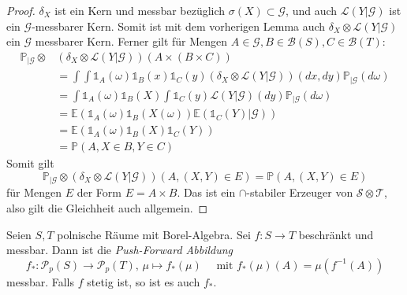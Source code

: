 \begin{proof}
    $\delta_X$ ist ein Kern und messbar bezüglich $\sigma(X)\subset \mathcal{G}$, und auch $\mathcal{L}(Y\vert \mathcal{G})$ ist ein $\mathcal{G}$-messbarer Kern. Somit ist mit dem vorherigen Lemma auch $\delta_X \otimes \mathcal{L}(Y\vert\mathcal{G})$ ein $\mathcal{G}$ messbarer Kern. Ferner gilt für Mengen $A\in \mathcal{G}, B\in\mathcal{B}(S), C \in \mathcal{B}(T)$:
    \begin{align*}
        \mathbb{P}_{\vert\mathcal{G}} \otimes &\left(\delta_X\otimes \mathcal{L}(Y\vert \mathcal{G})\right)(A\times(B\times C)) \\
        &= \int \int \mathds{1}_A(\omega)\mathds{1}_B(x)\mathds{1}_C(y) (\delta_X\otimes \mathcal{L}(Y\vert\mathcal{G}))(dx, dy)\mathbb{P}_{\vert\mathcal{G}}(d\omega) \\
        &= \int \mathds{1}_A(\omega) \mathds{1}_B(X)\int\mathds{1}_C(y)\mathcal{L}(Y\vert\mathcal{G})(dy)\mathbb{P}_{\vert\mathcal{G}}(d\omega) \\
        &= \mathbb{E}\left(\mathds{1}_A(\omega)\mathds{1}_B(X(\omega))\mathbb{E}(\mathds{1}_C(Y)\vert \mathcal{G})\right) \\
        &= \mathbb{E}(\mathds{1}_A(\omega)\mathds{1}_B(X)\mathds{1}_C(Y)) \\
        &= \mathbb{P}(A, X\in B, Y\in C)
    \end{align*}
    Somit gilt 
    $$\mathbb{P}_{\vert\mathcal{G}} \otimes \left(\delta_X\otimes \mathcal{L}(Y\vert \mathcal{G})\right)(A, (X, Y) \in E) = \mathbb{P}(A, (X, Y)\in E)$$
    für Mengen $E$ der Form $E=A\times B$. Das ist ein $\cap$-stabiler Erzeuger von $\mathcal{S}\otimes\mathcal{T}$, also gilt die Gleichheit auch allgemein.
\end{proof}
\begin{lemma}\label{thm:pushforward_measurable}
Seien $S, T$ polnische Räume mit Borel-Algebra. Sei $f:S\rightarrow T$ beschränkt und messbar. Dann ist die \emph{Push-Forward Abbildung} 
$$f_*:\mathcal{P}_p(S)\rightarrow\mathcal{P}_p(T), \, \mu \mapsto f_*(\mu)\quad  \text{ mit } f_*(\mu)(A) = \mu(f^{-1}(A))$$
messbar. Falls $f$ stetig ist, so ist es auch $f_*$.
\end{lemma}
